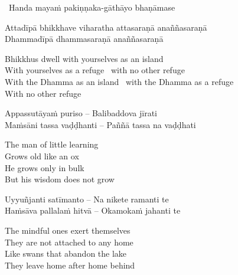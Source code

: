\begin{leader}
  \anglebracketleft\ \hspace{-0.5mm}Handa mayaṁ pakiṇṇaka-gāthāyo bhaṇāmase \hspace{-0.5mm}\anglebracketright\
\end{leader}

\begin{verses}
  Attadīpā bhikkhave viharatha attasaraṇā anaññasaraṇā\\
  Dhammadīpā dhammasaraṇā anaññasaraṇā
\end{verses}

\begin{english-verses}
  Bhikkhus dwell with yourselves as an island\\
  With yourselves as a refuge \breathmark\ with no other refuge\\
  With the Dhamma as an island \breathmark\ with the Dhamma as a refuge\\
  With no other refuge
\end{english-verses}

\suttaRef{[SN 22.43]}

\begin{verses}
  Appassutāyaṁ puriso – Balibaddova jīrati\\
  Maṁsāni tassa vaḍḍhanti – Paññā tassa na vaḍḍhati
\end{verses}

\begin{english-verses}
  The man of little learning\\
  Grows old like an ox\\
  He grows only in bulk\\
  But his wisdom does not grow
\end{english-verses}

\suttaRef{[Dhp 152]}

\begin{verses}
  Uyyuñjanti satīmanto – Na nikete ramanti te\\
  Haṁsāva pallalaṁ hitvā – Okamokaṁ jahanti te
\end{verses}

\begin{english-verses}
  The mindful ones exert themselves\\
  They are not attached to any home\\
  Like swans that abandon the lake\\
  They leave home after home behind
\end{english-verses}

